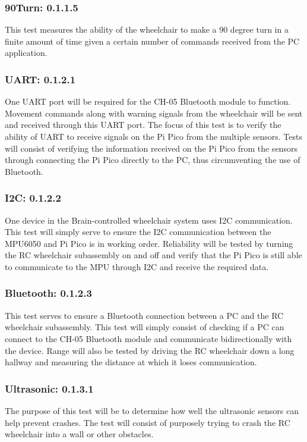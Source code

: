 \documentclass[conference]{IEEEtran}
\begin{document}
        \subsubsection{90\textdegree Turn: 0.1.1.5}
        This test measures the ability of the wheelchair to make a 90 degree turn in a finite amount of time given a certain number of commands received from the PC application. 
        
        \subsubsection{UART: 0.1.2.1}
        One UART port will be required for the CH-05 Bluetooth module to function. Movement commands along with warning signals from the wheelchair will be sent and received through this UART port. The focus of this test is to verify the ability of UART to receive signals on the Pi Pico from the multiple sensors. Tests will consist of verifying the information received on the Pi Pico from the sensors through connecting the Pi Pico directly to the PC, thus circumventing the use of Bluetooth. 


        \subsubsection{I2C: 0.1.2.2}
        One device in the Brain-controlled wheelchair system uses I2C communication. This test will simply serve to ensure the I2C communication between the MPU6050 and Pi Pico is in working order. Reliability will be tested by turning the RC wheelchair subassembly on and off and verify that the Pi Pico is still able to communicate to the MPU through I2C and receive the required data. 

        \subsubsection{Bluetooth: 0.1.2.3}
        This test serves to ensure a Bluetooth connection between a PC and the RC wheelchair subassembly. This test will simply consist of checking if a PC can connect to the CH-05 Bluetooth module and communicate bidirectionally with the device. Range will also be tested by driving the RC wheelchair down a long hallway and measuring the distance at which it loses communication. 

        \subsubsection{Ultrasonic: 0.1.3.1}
        The purpose of this test will be to determine how well the ultrasonic sensors can help prevent crashes. The test will consist of purposely trying to crash the RC wheelchair into a wall or other obstacles. 
\end{document}
